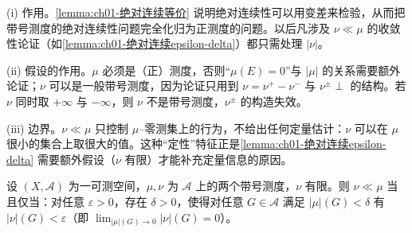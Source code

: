 \documentclass[../../main.tex]{subfiles}%
\begin{document}
\begin{remark}\label{remark:ch01-绝对连续等价动机}
(i) 作用。\cref{lemma:ch01-绝对连续等价} 说明绝对连续性可以用变差来检验，从而把带号测度的绝对连续性问题完全化归为正测度的问题。以后凡涉及 $\nu\ll\mu$ 的收敛性论证（如\cref{lemma:ch01-绝对连续epsilon-delta}）都只需处理 $|\nu|$。

(ii) 假设的作用。$\mu$ 必须是（正）测度，否则“$\mu(E)=0$”与 $|\mu|$ 的关系需要额外论证；$\nu$ 可以是一般带号测度，因为论证只用到 $\nu=\nu^+-\nu^-$ 与 $\nu^\pm\perp$ 的结构。若 $\nu$ 同时取 $+\infty$ 与 $-\infty$，则 $\nu$ 不是带号测度，$\nu^\pm$ 的构造失效。

(iii) 边界。$\nu\ll\mu$ 只控制 $\mu$--零测集上的行为，不给出任何定量估计：$\nu$ 可以在 $\mu$ 很小的集合上取很大的值。这种“定性”特征正是\cref{lemma:ch01-绝对连续epsilon-delta} 需要额外假设（$\nu$ 有限）才能补充定量信息的原因。
\end{remark}

\begin{lemma}\label{lemma:ch01-绝对连续epsilon-delta}
设 $(X,\mathcal{A})$ 为一可测空间，$\mu,\nu$ 为 $\mathcal{A}$ 上的两个带号测度，$\nu$ 有限。则 $\nu\ll\mu$ 当且仅当：对任意 $\varepsilon>0$，存在 $\delta>0$，使得对任意 $G\in\mathcal{A}$ 满足 $|\mu|(G)<\delta$ 有 $|\nu|(G)<\varepsilon$（即 $\lim_{|\mu|(G)\to0}|\nu|(G)=0$）。
\end{lemma}
\end{document}
